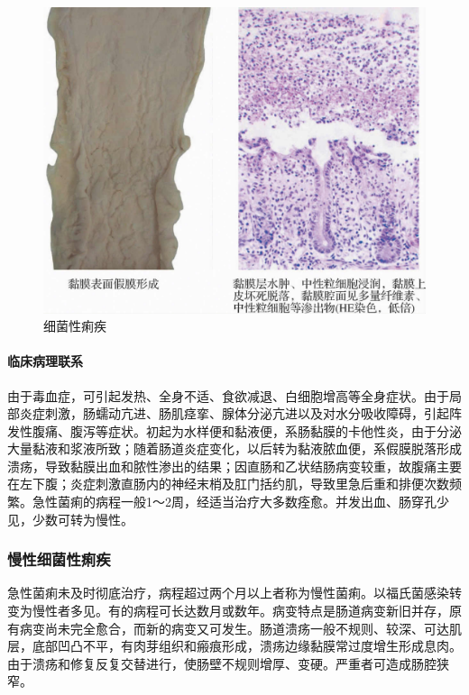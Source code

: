 \begin{figure}[!htbp]
    \centering
    \includegraphics{./images/Image00239.jpg}
    \captionsetup{justification=centering}
    \caption{细菌性痢疾}
    \label{fig14-14}
\end{figure}

\paragraph{临床病理联系}
由于毒血症，可引起发热、全身不适、食欲减退、白细胞增高等全身症状。由于局部炎症刺激，肠蠕动亢进、肠肌痉挛、腺体分泌亢进以及对水分吸收障碍，引起阵发性腹痛、腹泻等症状。初起为水样便和黏液便，系肠黏膜的卡他性炎，由于分泌大量黏液和浆液所致；随着肠道炎症变化，以后转为黏液脓血便，系假膜脱落形成溃疡，导致黏膜出血和脓性渗出的结果；因直肠和乙状结肠病变较重，故腹痛主要在左下腹；炎症刺激直肠内的神经末梢及肛门括约肌，导致里急后重和排便次数频繁。急性菌痢的病程一般1～2周，经适当治疗大多数痊愈。并发出血、肠穿孔少见，少数可转为慢性。

\subsubsection{慢性细菌性痢疾}

急性菌痢未及时彻底治疗，病程超过两个月以上者称为慢性菌痢。以福氏菌感染转变为慢性者多见。有的病程可长达数月或数年。病变特点是肠道病变新旧并存，原有病变尚未完全愈合，而新的病变又可发生。肠道溃疡一般不规则、较深、可达肌层，底部凹凸不平，有肉芽组织和瘢痕形成，溃疡边缘黏膜常过度增生形成息肉。由于溃疡和修复反复交替进行，使肠壁不规则增厚、变硬。严重者可造成肠腔狭窄。

